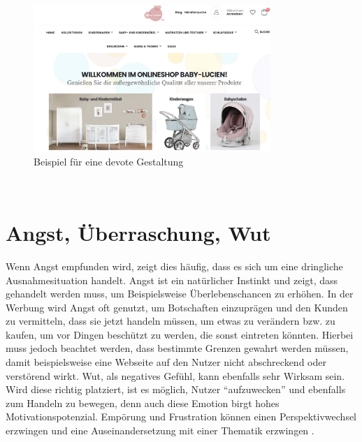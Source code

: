 \documentclass[./dokumentation.tex]{subfiles}
\begin{document}
\begin{figure}[H]
    \centering
    \includegraphics[width=0.8\textwidth]{bilder/unt.png}
    \caption{Beispiel für eine devote Gestaltung \cite{unt_bsp}}
    \label{fig8:unt}
\end{figure}\\
\section{Angst, Überraschung, Wut}
Wenn Angst empfunden wird, zeigt dies häufig, dass es sich um eine dringliche Ausnahmesituation handelt. Angst ist ein natürlicher Instinkt und zeigt, dass gehandelt werden muss, um Beispielsweise Überlebenschancen zu erhöhen. In der Werbung wird Angst oft genutzt, um Botschaften einzuprägen und den Kunden zu vermitteln, dass sie jetzt handeln müssen, um etwas zu verändern bzw. zu kaufen, um vor Dingen beschützt zu werden, die sonst eintreten könnten. Hierbei muss jedoch beachtet werden, dass bestimmte Grenzen gewahrt werden müssen, damit beispielsweise eine Webseite auf den Nutzer nicht abschreckend oder verstörend wirkt.
Wut, als negatives Gefühl, kann ebenfalls sehr Wirksam 
sein. Wird diese richtig platziert, ist es möglich, Nutzer “aufzuwecken” und ebenfalls zum Handeln zu bewegen, denn auch diese Emotion birgt hohes Motivationspotenzial. Empörung und Frustration können einen Perspektivwechsel erzwingen und eine Auseinandersetzung mit einer Thematik erzwingen  \cite{Schubert2016}.
\end{document}
